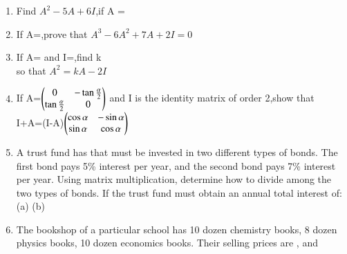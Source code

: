 \begin{enumerate}[label=\arabic*.,ref=\thesubsection.\theenumi]
\\
(ii)$\myvec{1 &2 &3\\0 &1 &0\\1 &1 &0}\myvec{-1 &1 &0\\0 &-1 &1\\2 &3 &4}\neq \myvec{-1 &1 &0\\0 &-1 &1\\2 &3 &4}\myvec{1 &2 &3\\0 &1 &0\\1 &1 &0}$\\
\solution 


\item Find $A^{2}-5A+6I$,if A = \\
\solution 

\item If A=,prove that $A^3-6A^2+7A+2I=0$\\
\solution 

\item If A= and I=,find k\\
 so that $A^2=kA-2I$\\
\solution 

\item If A=$\begin{pmatrix}0 &-\tan\frac{\alpha}{2}\\  \tan\frac{\alpha}{2} &0\end{pmatrix}$ and I is the identity matrix of order 2,show that \\I+A=(I-A)$\begin{pmatrix}\cos\alpha &-\sin\alpha\\\sin\alpha &\cos\alpha\end{pmatrix}$\\
\item A trust fund has  that must be invested in two different types of bonds.
The first bond pays 5\% interest per year, and the second bond pays 7\% interest
per year. Using matrix multiplication, determine how to divide  among
the two types of bonds. If the trust fund must obtain an annual total interest of:\\
(a)  (b)\\
\item The bookshop of a particular school has 10 dozen chemistry books, 8 dozen
physics books, 10 dozen economics books. Their selling prices are ,  and

\end{enumerate}
